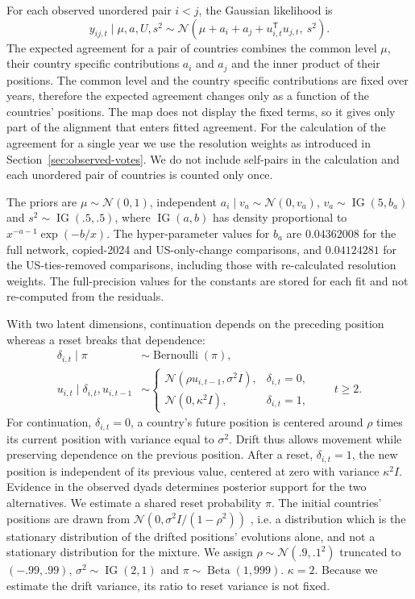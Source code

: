 \documentclass[10pt,authoryear]{elsarticle}
\begin{document}
For each observed unordered pair $i<j$, the Gaussian likelihood is
\[
y_{ij,t}\mid\mu,a,U,s^2\sim\mathcal N\!\left(\mu+a_i+a_j+u_{i,t}^{\mathsf T}u_{j,t},\ s^2\right).
\]
The expected agreement for a pair of countries combines the common level $\mu$, their country specific contributions $a_i$ and $a_j$ and the inner product of their positions. The common level and the country specific contributions are fixed over years, therefore the expected agreement changes only as a function of the countries’ positions. The map does not display the fixed terms, so it gives only part of the alignment that enters fitted agreement. For the calculation of the agreement for a single year we use the resolution weights as introduced in Section~\ref{sec:observed-votes}. We do not include self-pairs in the calculation and each unordered pair of countries is counted only once.

The priors are $\mu\sim\mathcal N(0,1)$, independent $a_i\mid v_a\sim\mathcal N(0,v_a)$, $v_a\sim\operatorname{IG}(5,b_a)$ and $s^2\sim\operatorname{IG}(.5,.5)$, where $\operatorname{IG}(a,b)$ has density proportional to $x^{-a-1}\exp(-b/x)$. The hyper-parameter values for $b_a$ are $0.04362008$ for the full network, copied-2024 and US-only-change comparisons, and $0.04124281$ for the US-ties-removed comparisons, including those with re-calculated resolution weights. The full-precision values for the constants are stored for each fit and not re-computed from the residuals.

With two latent dimensions, continuation depends on the preceding position whereas a reset breaks that dependence:
\[
\begin{aligned}
\delta_{i,t}\mid\pi&\sim\operatorname{Bernoulli}(\pi),\\
u_{i,t}\mid\delta_{i,t},u_{i,t-1}&\sim
\begin{cases}
\mathcal N(\rho u_{i,t-1},\sigma^2 I),&\delta_{i,t}=0,\\
\mathcal N(0,\kappa^2 I),&\delta_{i,t}=1,
\end{cases}\qquad t\geq2.
\end{aligned}
\]
For continuation, $\delta_{i,t}=0$, a country's future position is centered around $\rho$ times its current position with variance equal to $\sigma^2$. Drift thus allows movement while preserving dependence on the previous position. After a reset, $\delta_{i,t}=1$, the new position is independent of its previous value, centered at zero with variance $\kappa^2 I$. Evidence in the observed dyads determines posterior support for the two alternatives. We estimate a shared reset probability $\pi$. The initial countries' positions are drawn from $\mathcal N(0,\sigma^2 I/(1-\rho^2))$ , i.e. a distribution which is the stationary distribution of the drifted positions' evolutions alone, and not a stationary distribution for the mixture. We assign $\rho\sim\mathcal N(.9,.1^2)$ truncated to $(-.99,.99)$, $\sigma^2\sim\operatorname{IG}(2,1)$ and $\pi\sim\operatorname{Beta}(1,999)$. $\kappa=2$. Because we estimate the drift variance, its ratio to reset variance is not fixed.
\end{document}

